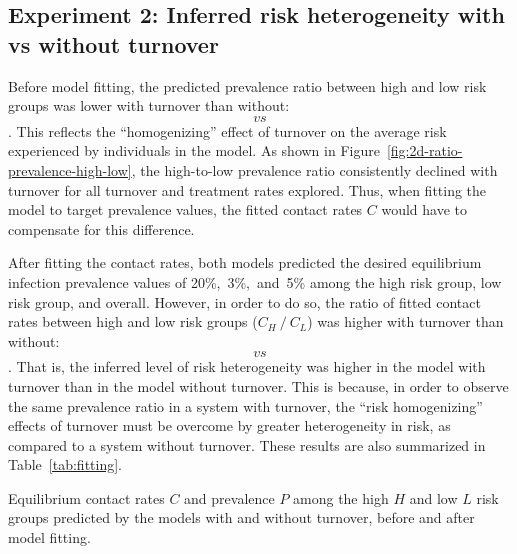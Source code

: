 \subsection{Experiment 2: Inferred risk heterogeneity with vs without turnover}
\label{ss:res-infer}
Before model fitting, the predicted prevalence ratio
between high and low risk groups was lower with turnover than without:
$$~vs~%
$$.
This reflects the ``homogenizing'' effect of turnover on
the average risk experienced by individuals in the model.
As shown in Figure~\ref{fig:2d-ratio-prevalence-high-low},
the high-to-low prevalence ratio consistently declined with turnover
for all turnover and treatment rates explored.
Thus, when fitting the model to target prevalence values,
the fitted contact rates $C$ would have to compensate for this difference.
\par
After fitting the contact rates, both models predicted
the desired equilibrium infection prevalence values of 20\%,~3\%,~and~5\%
among the high risk group, low risk group, and overall.
However, in order to do so, the ratio of fitted contact rates
between high and low risk groups ($C_H~/~C_L$)
was higher with turnover than without:
$$~vs~%
$$.
That is, the inferred level of risk heterogeneity was higher
in the model with turnover than in the model without turnover.
This is because,
in order to observe the same prevalence ratio in a system with turnover,
the ``risk homogenizing'' effects of turnover must be overcome by
greater heterogeneity in risk, as compared to a system without turnover.
These results are also summarized in Table~\ref{tab:fitting}.
\begin{table}
  \centering
  \caption{Equilibrium contact rates $C$ and prevalence $P$
    among the high $H$ and low $L$ risk groups
    predicted by the models with and without turnover,
    before and after model fitting.}
  \label{tab:fitting}
  
\end{table}
